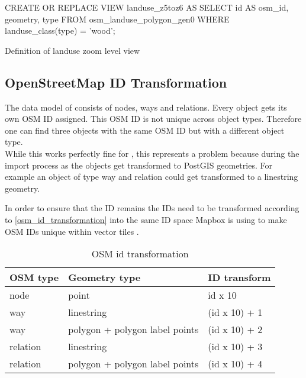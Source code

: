 \begin{listing}[H]
\begin{sqlcode}
CREATE OR REPLACE VIEW landuse_z5toz6 AS
    SELECT id AS osm_id, geometry, type
    FROM osm_landuse_polygon_gen0
    WHERE landuse_class(type) = 'wood';
\end{sqlcode}
\caption{Definition of landuse zoom level view}
\label{definition_of_landuse_zoom_level_view}
\end{listing}
\clearpage

\subsection{OpenStreetMap ID Transformation}

The data model of \osm{} consists of nodes, ways and relations. Every object gets its own OSM ID assigned. This OSM ID is not unique across object types. Therefore one can find three objects with the same OSM ID but with a different object type.\\
While this works perfectly fine for \osm{}, this represents a problem because during the import process as the \osm{} objects get transformed to PostGIS geometries. For example an object of type way and relation could get transformed to a linestring geometry.

In order to ensure that the \osm{} ID remains the IDs need to be transformed according to \autoref{osm_id_transformation} into the same ID space Mapbox is using to make OSM IDs unique within vector tiles \cite{103_mapbox.com_2016}.

\begin{table}[H]
\centering

\begin{tabular}{lll}
\hline
OSM type & Geometry type                  & \osm{} ID transform \\ \hline
node     & point                          & id x 10          \\
way      & linestring                           & (id x 10) + 1    \\
way      & polygon + polygon label points & (id x 10) + 2    \\
relation & linestring                           & (id x 10) + 3    \\
relation & polygon + polygon label points & (id x 10) + 4    \\
\end{tabular}
\caption{OSM id transformation}
\label{osm_id_transformation}
\end{table}

